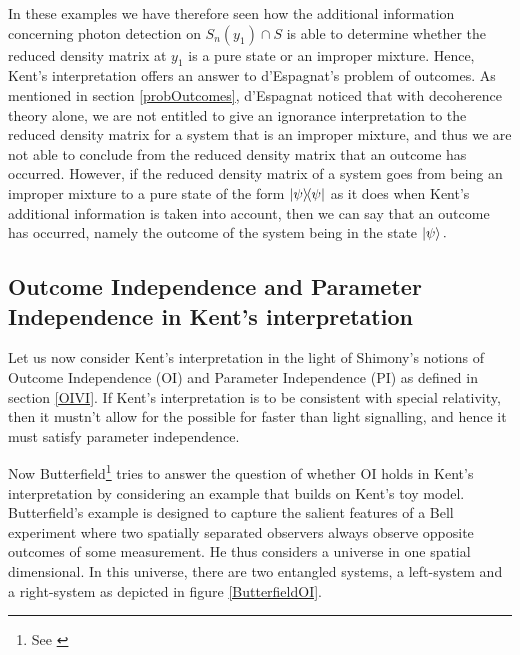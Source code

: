 In these examples we have therefore seen how the additional information concerning photon detection on $S_n(y_1)\cap S$ is able to determine whether the reduced density matrix at $y_1$ is a pure state or an improper mixture. Hence, Kent's interpretation offers an answer to d'Espagnat's problem of outcomes. As mentioned in section \ref{probOutcomes}, d'Espagnat noticed that with decoherence theory alone, we are not entitled to give an ignorance interpretation to the reduced density matrix for a system that is an improper mixture, and thus we are not able to conclude from the reduced density matrix that an outcome has occurred. However, if the reduced density matrix of a system goes from being an improper mixture to a pure state of the form $\dyad{\psi}$ as it does when Kent's additional information is taken into account, then we can say that an outcome has occurred, namely the outcome of the system being in the state $\ket{\psi}.$  




\subsection{Outcome Independence and Parameter Independence in Kent's interpretation}
Let us now consider Kent's interpretation in the light of Shimony's notions of Outcome Independence (OI) and Parameter Independence (PI) as defined in section \ref{OIVI}. If Kent's interpretation is to be consistent with special relativity, then it mustn't allow for the possible for faster than light signalling, and hence it must satisfy parameter independence. 

Now Butterfield\footnote{See \cite[30-32]{Butterfield}} tries to answer the question of whether OI holds in Kent's interpretation by considering an example that builds on Kent's toy model. Butterfield's example is designed to capture the salient features of a Bell experiment where two spatially separated observers always observe opposite outcomes of some measurement. He thus considers a universe in one spatial dimensional. In this universe, there are two entangled systems, a left-system and a right-system as depicted in figure \ref{ButterfieldOI}.

